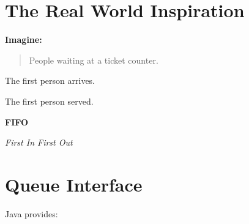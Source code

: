 \documentclass[11pt,a4paper]{book}
\begin{document}















\section{The Real World Inspiration}

\textbf{Imagine:}

\begin{quote}
People waiting at a ticket counter.
\end{quote}

The first person arrives.

The first person served.

\smallskip

\begin{center}
{\Large\bfseries\textcolor{RosettaBlue}{FIFO}}

\smallskip

\textit{First In First Out}
\end{center}
\section{Queue Interface}

Java provides:
\end{document}
